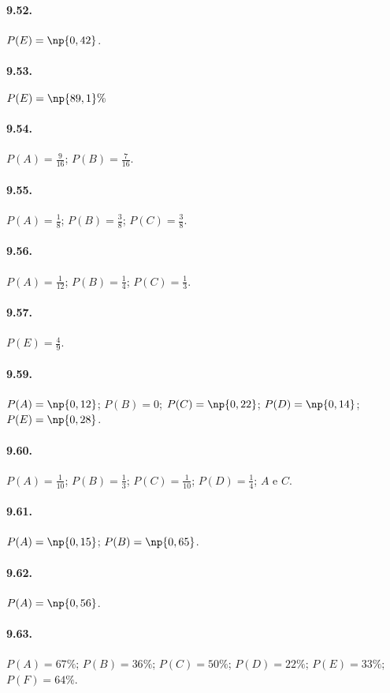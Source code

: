 \begin{multicols}{2}
\paragraph{9.52.} $P(E)=\np{0,42}$.

\paragraph{9.53.} $P(E)=\np{89,1}\%$

\paragraph{9.54.} $ P(A)=\frac 9 {16}$; $P(B)=\frac 7 {16} $.

\paragraph{9.55.} $ P(A)=\frac 1 8$; $P(B)=\frac3 8$; $P(C)=\frac 3 8 $.

\paragraph{9.56.} $ P(A)=\frac 1 {12}$; $P(B)=\frac1 4$; $P(C)=\frac 1 3 $.

\paragraph{9.57.} $ P(E)=\frac 4 9 $.

\paragraph{9.59.} $P(A)=\np{0,12}$; $P(B)=0$; $P(C)=\np{0,22}$; $P(D)=\np{0,14}$; $P(E)=\np{0,28}$.

\paragraph{9.60.} $ P(A)=\frac 1{10}$; $ P(B)=\frac 1 3 $; $ P(C)=\frac 1{10} $; $ P(D)=\frac 1 4 $; $A$ e $C$.

\paragraph{9.61.} $P(A)=\np{0,15}$; $P(B)=\np{0,65}$.

\paragraph{9.62.} $P(A)=\np{0,56}$.

\paragraph{9.63.} $P(A)=67\%$; $P(B)=36\%$; $P(C)=50\%$; $P(D)=22\%$; $P(E)=33\%$; $P(F)=64\%$.
\end{multicols}

